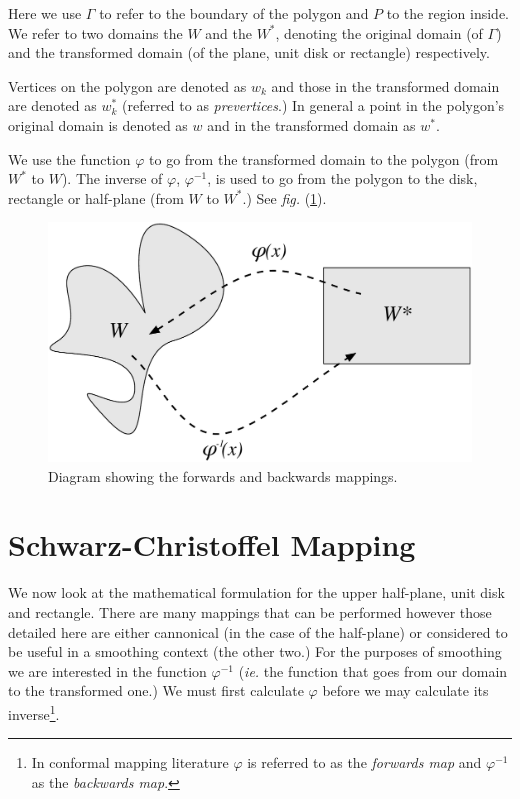 \documentclass[a4paper,10pt]{amsart}
\newcommand{\sch}{Schwarz-Christoffel }
\newcommand{\fig}[1]{\emph{fig.} (\ref{#1})}
\renewcommand{\phi}{\varphi}
\begin{document}
Here we use $\Gamma$ to refer to the boundary of the polygon and $P$ to the region inside. We refer to two domains the $W$ and the $W^*$, denoting the original domain (of $\Gamma$) and the transformed domain (of the plane, unit disk or rectangle) respectively. 

Vertices on the polygon are denoted as $w_k$ and those in the transformed domain are denoted as $w^*_k$ (referred to as \emph{prevertices}.) In general a point in the polygon's original domain is denoted as $w$ and in the transformed domain as $w^*$.

We use the function $\phi$ to go from the transformed domain to the polygon (from $W^*$ to $W$). The inverse of $\phi$, $\phi^{-1}$, is used to go from the polygon to the disk, rectangle or half-plane (from $W$ to $W^*$.)  See \fig{mappingdia}.

\begin{figure} [tbp]
\centering
\includegraphics[scale=0.5]{figs/mappingdia.pdf}
\caption{Diagram showing the forwards and backwards mappings.}
\label{mappingdia}
\end{figure}


\section{\sch Mapping}

We now look at the mathematical formulation for the upper half-plane, unit disk and rectangle. There are many mappings that can be performed however those detailed here are either cannonical (in the case of the half-plane) or considered to be useful in a smoothing context (the other two.) For the purposes of smoothing we are interested in the function $\phi^{-1}$ (\emph{ie.} the function that goes from our domain to the transformed one.) We must first calculate $\phi$ before we may calculate its inverse\footnote{In conformal mapping literature $\phi$ is referred to as the \emph{forwards map} and $\phi^{-1}$ as the \emph{backwards map}.}.
\end{document}
